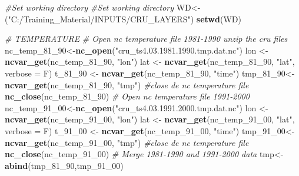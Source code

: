 \documentclass[
  10pt,
  b5paper,
]{book}
\newenvironment{Shaded}{\begin{snugshade}}{\end{snugshade}}
\newcommand{\CommentTok}[1]{\textcolor[rgb]{0.56,0.35,0.01}{\textit{#1}}}
\newcommand{\DataTypeTok}[1]{\textcolor[rgb]{0.13,0.29,0.53}{#1}}
\newcommand{\DecValTok}[1]{\textcolor[rgb]{0.00,0.00,0.81}{#1}}
\newcommand{\KeywordTok}[1]{\textcolor[rgb]{0.13,0.29,0.53}{\textbf{#1}}}
\newcommand{\NormalTok}[1]{#1}
\newcommand{\StringTok}[1]{\textcolor[rgb]{0.31,0.60,0.02}{#1}}
\begin{document}
\begin{Shaded}
\begin{Highlighting}[]
\CommentTok{#Set working directory}
\CommentTok{#Set working directory}
\NormalTok{WD<-(}\StringTok{"C:/Training_Material/INPUTS/CRU_LAYERS"}\NormalTok{)}
\KeywordTok{setwd}\NormalTok{(WD)}

\CommentTok{# TEMPERATURE}
\CommentTok{# Open nc temperature file 1981-1990 unzip the cru files}
\NormalTok{nc_temp_}\DecValTok{81}\NormalTok{_}\DecValTok{90}\NormalTok{<-}\KeywordTok{nc_open}\NormalTok{(}\StringTok{"cru_ts4.03.1981.1990.tmp.dat.nc"}\NormalTok{)}
\NormalTok{lon <-}\StringTok{ }\KeywordTok{ncvar_get}\NormalTok{(nc_temp_}\DecValTok{81}\NormalTok{_}\DecValTok{90}\NormalTok{, }\StringTok{"lon"}\NormalTok{)}
\NormalTok{lat <-}\StringTok{ }\KeywordTok{ncvar_get}\NormalTok{(nc_temp_}\DecValTok{81}\NormalTok{_}\DecValTok{90}\NormalTok{, }\StringTok{"lat"}\NormalTok{, }\DataTypeTok{verbose =}\NormalTok{ F)}
\NormalTok{t_}\DecValTok{81}\NormalTok{_}\DecValTok{90}\NormalTok{ <-}\StringTok{ }\KeywordTok{ncvar_get}\NormalTok{(nc_temp_}\DecValTok{81}\NormalTok{_}\DecValTok{90}\NormalTok{, }\StringTok{"time"}\NormalTok{)}
\NormalTok{tmp_}\DecValTok{81}\NormalTok{_}\DecValTok{90}\NormalTok{<-}\KeywordTok{ncvar_get}\NormalTok{(nc_temp_}\DecValTok{81}\NormalTok{_}\DecValTok{90}\NormalTok{, }\StringTok{"tmp"}\NormalTok{)}
\CommentTok{#close de nc temperature file}
\KeywordTok{nc_close}\NormalTok{(nc_temp_}\DecValTok{81}\NormalTok{_}\DecValTok{90}\NormalTok{) }
\CommentTok{# Open nc temperature file 1991-2000}
\NormalTok{nc_temp_}\DecValTok{91}\NormalTok{_}\DecValTok{00}\NormalTok{<-}\KeywordTok{nc_open}\NormalTok{(}\StringTok{"cru_ts4.03.1991.2000.tmp.dat.nc"}\NormalTok{)}
\NormalTok{lon <-}\StringTok{ }\KeywordTok{ncvar_get}\NormalTok{(nc_temp_}\DecValTok{91}\NormalTok{_}\DecValTok{00}\NormalTok{, }\StringTok{"lon"}\NormalTok{)}
\NormalTok{lat <-}\StringTok{ }\KeywordTok{ncvar_get}\NormalTok{(nc_temp_}\DecValTok{91}\NormalTok{_}\DecValTok{00}\NormalTok{, }\StringTok{"lat"}\NormalTok{, }\DataTypeTok{verbose =}\NormalTok{ F)}
\NormalTok{t_}\DecValTok{91}\NormalTok{_}\DecValTok{00}\NormalTok{ <-}\StringTok{ }\KeywordTok{ncvar_get}\NormalTok{(nc_temp_}\DecValTok{91}\NormalTok{_}\DecValTok{00}\NormalTok{, }\StringTok{"time"}\NormalTok{)}
\NormalTok{tmp_}\DecValTok{91}\NormalTok{_}\DecValTok{00}\NormalTok{<-}\KeywordTok{ncvar_get}\NormalTok{(nc_temp_}\DecValTok{91}\NormalTok{_}\DecValTok{00}\NormalTok{, }\StringTok{"tmp"}\NormalTok{)}
\CommentTok{#close de nc temperature file}
\KeywordTok{nc_close}\NormalTok{(nc_temp_}\DecValTok{91}\NormalTok{_}\DecValTok{00}\NormalTok{) }
\CommentTok{# Merge 1981-1990 and 1991-2000 data }
\NormalTok{tmp<-}\KeywordTok{abind}\NormalTok{(tmp_}\DecValTok{81}\NormalTok{_}\DecValTok{90}\NormalTok{,tmp_}\DecValTok{91}\NormalTok{_}\DecValTok{00}\NormalTok{)}
\end{Highlighting}
\end{Shaded}
\end{document}

